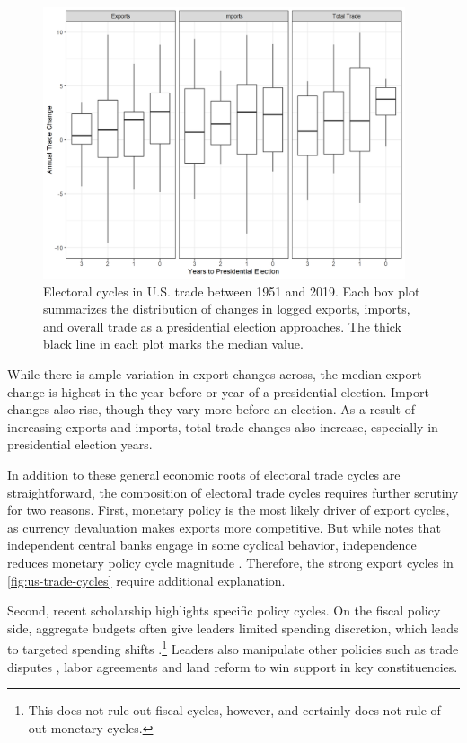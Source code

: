 \documentclass[12pt]{article}
\begin{document}
\begin{figure}
\centering
\includegraphics[width=0.95\textwidth]{../figures/us-trade-cycles.png}
\caption{Electoral cycles in U.S. trade between 1951 and 2019. Each box plot summarizes the distribution of changes in logged exports, imports, and overall trade as a presidential election approaches. The thick black line in each plot marks the median value.}
\label{fig:us-trade-cycles}
\end{figure}


While there is ample variation in export changes across, the median export change is highest in the year before or year of a presidential election.
Import changes also rise, though they vary more before an election. 
As a result of increasing exports and imports, total trade changes also increase, especially in presidential election years.


In addition to these general economic roots of electoral trade cycles are straightforward, the composition of electoral trade cycles requires further scrutiny for two reasons.
First, monetary policy is the most likely driver of export cycles, as currency devaluation makes exports more competitive. 
But while \citet[pg. 247]{Dubois2016} notes that independent central banks engage in some cyclical behavior, independence reduces monetary policy cycle magnitude \citep{ClarkHallerberg2000}. 
Therefore, the strong export cycles in \autoref{fig:us-trade-cycles} require additional explanation. 


Second, recent scholarship highlights specific policy cycles. 
On the fiscal policy side, aggregate budgets often give leaders limited spending discretion, which leads to targeted spending shifts \citep[pg. 248]{Dubois2016}.\footnote{This does not rule out fiscal cycles, however, and certainly does not rule of out monetary cycles.} 
Leaders also manipulate other policies such as trade disputes \citep{Conconietal2017}, labor agreements \citep{Ahlquist2010} and land reform \cite{Philips2020} to win support in key constituencies.
\end{document}
